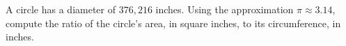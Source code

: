 A circle has a diameter of $376{,}216$ inches. Using the approximation $\pi\approx3.14$, compute the ratio of the circle's area, in square inches, to its circumference, in inches.
